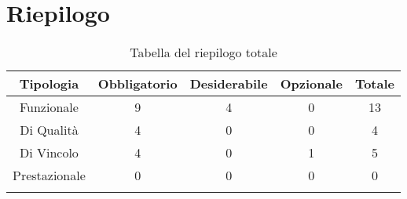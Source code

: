 \section{Riepilogo}

\begin{center}
  \centering
  \begin{longtable}{|c|c|c|c|c|}
    \hline
    \rowcolor[HTML]{036400}
    {\color[HTML]{FFFFFF} \textbf{Tipologia}} & {\color[HTML]{FFFFFF} \textbf{Obbligatorio}} & {\color[HTML]{FFFFFF} \textbf{Desiderabile}} & {\color[HTML]{FFFFFF} \textbf{Opzionale}}  & {\color[HTML]{FFFFFF} \textbf{Totale}} \\ \hline
    \rowcolor[HTML]{EFEFEF}
    Funzionale & 9 & 4 & 0 & 13 \\ \hline
    \rowcolor[HTML]{C0C0C0}
    Di Qualità & 4 & 0 & 0 & 4 \\ \hline
    \rowcolor[HTML]{EFEFEF}
    Di Vincolo & 4 & 0 & 1 & 5 \\ \hline
    \rowcolor[HTML]{C0C0C0}
    Prestazionale & 0 & 0 & 0 & 0 \\ \hline

    \caption{Tabella del riepilogo totale}
  \end{longtable}
\end{center}
